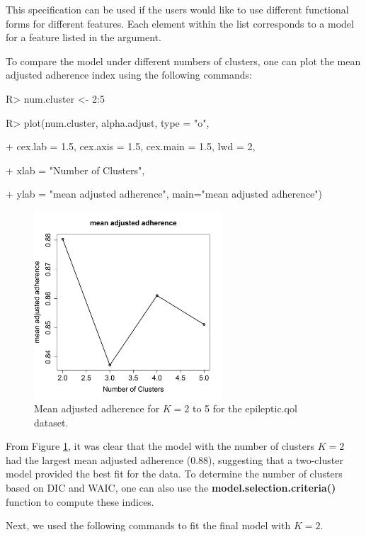 This specification can be used if the users would like to use different functional forms for different features. Each element within the list corresponds to a model for a feature listed in the  argument.  

To compare the model under different numbers of clusters, one can plot the mean adjusted adherence index using the following commands: 

\begin{example}

R> num.cluster <- 2:5

R> plot(num.cluster, alpha.adjust, type = "o",

+        cex.lab = 1.5, cex.axis = 1.5, cex.main = 1.5, lwd = 2,

+        xlab = "Number of Clusters",

+        ylab = "mean adjusted adherence", main="mean adjusted adherence")

\end{example}

\begin{figure}[h]
\centering
\includegraphics[width=7cm,height=7cm]{./Figures/num_cluster.JPEG}
\caption{\label{fig:num_cluster} Mean adjusted adherence for $K = 2$ to 5 for the epileptic.qol dataset.}
\end{figure}

From Figure \ref{fig:num_cluster}, it was clear that the model with the number of clusters $K=2$ had the largest mean adjusted adherence (0.88), suggesting that a two-cluster model provided the best fit for the data. To determine the number of clusters based on DIC and WAIC, one can also use the \textbf{model.selection.criteria()} function to compute these indices.

Next, we used the following commands to fit the final model with $K=2$. 

